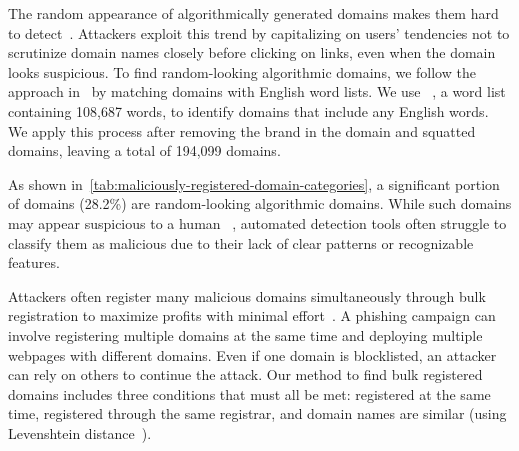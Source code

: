 

The random appearance of algorithmically generated domains makes them hard to detect~\cite{UsingAno20:online,Automati98:online}. 
Attackers exploit this trend by capitalizing on users’ tendencies not to scrutinize domain names closely before clicking on links, even when the domain looks suspicious. 
To find random-looking algorithmic domains, we follow the approach in~\cite{Automati98:online} by matching domains with English word lists.
We use ~\cite{SCOWLCus71:online}, a word list containing 108,687 words,  to identify domains that include any English words.
We apply this process after removing the brand in the domain and squatted domains, leaving a total of  194,099 domains.%

As shown in~\autoref{tab:maliciously-registered-domain-categories}, a significant portion of domains (28.2\%) are random-looking algorithmic domains.
While such domains may appear suspicious to a human ~\cite{Automati98:online}, automated detection tools often struggle to classify them as malicious due to their lack of clear patterns or recognizable features.

Attackers often  register many malicious domains simultaneously through bulk registration to maximize profits with minimal effort~\cite{hao2013understanding}. 
A phishing campaign can involve
registering multiple domains at the same time and deploying multiple webpages with different domains.
Even if one domain is blocklisted, an attacker can rely on others to continue the attack.
Our method to find bulk registered domains includes three conditions that must all be met: registered at the same time, registered through the same registrar, and domain names are similar (using Levenshtein distance~\cite{korczynski2018cybercrime}).

